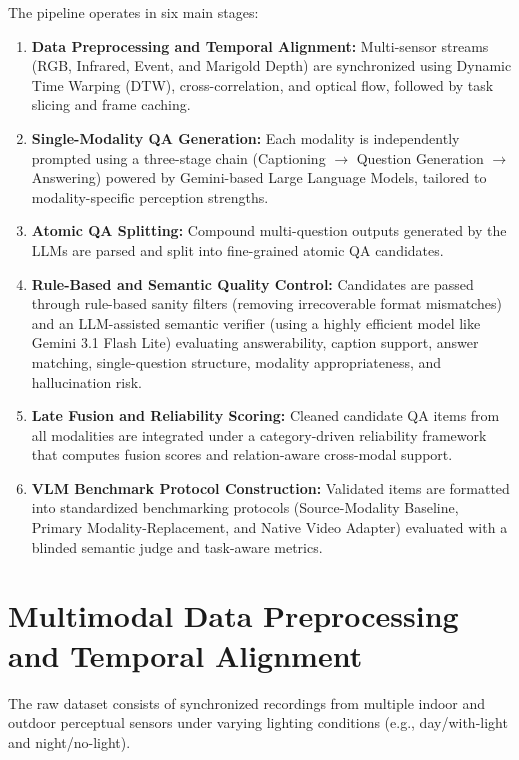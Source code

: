 The pipeline operates in six main stages:
\begin{enumerate}
    \item \textbf{Data Preprocessing and Temporal Alignment:} Multi-sensor streams
          (RGB, Infrared, Event, and Marigold Depth) are synchronized using
          Dynamic Time Warping (DTW), cross-correlation, and optical flow, followed
          by task slicing and frame caching.
    \item \textbf{Single-Modality QA Generation:} Each modality is independently
          prompted using a three-stage chain (Captioning $\rightarrow$ Question Generation
          $\rightarrow$ Answering) powered by Gemini-based Large Language Models, tailored to modality-specific perception strengths.
    \item \textbf{Atomic QA Splitting:} Compound multi-question outputs generated by the LLMs
          are parsed and split into fine-grained atomic QA candidates.
    \item \textbf{Rule-Based and Semantic Quality Control:} Candidates are passed through
          rule-based sanity filters (removing irrecoverable format mismatches) and an LLM-assisted semantic verifier
          (using a highly efficient model like Gemini 3.1 Flash Lite) evaluating answerability, caption support, answer matching, single-question structure, modality appropriateness, and hallucination risk.
    \item \textbf{Late Fusion and Reliability Scoring:} Cleaned candidate QA items from all
          modalities are integrated under a category-driven reliability framework that
          computes fusion scores and relation-aware cross-modal support.
    \item \textbf{VLM Benchmark Protocol Construction:} Validated items are formatted into
          standardized benchmarking protocols (Source-Modality Baseline, Primary
          Modality-Replacement, and Native Video Adapter) evaluated with a blinded
          semantic judge and task-aware metrics.
\end{enumerate}


\section{Multimodal Data Preprocessing and Temporal Alignment}
\label{sec:preprocessing_alignment}

The raw dataset consists of synchronized recordings from multiple indoor and outdoor
perceptual sensors under varying lighting conditions (e.g., day/with-light and night/no-light).

